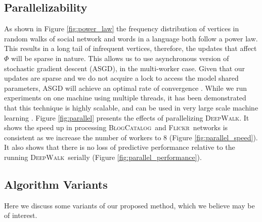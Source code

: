 \documentclass{sig-alternate}
\newcommand{\blogcatalog}{\textsc{BlogCatalog}}
\newcommand{\flickr}{\textsc{Flickr}}
\newcommand{\ouralgorithm}{\textsc{DeepWalk}}
\begin{document}
\subsection{Parallelizability}
As shown in Figure \ref{fig:power_law} the frequency distribution of vertices in random walks of social network and words in a language both follow a power law.
This results in a long tail of infrequent vertices, therefore, the updates that affect $\Phi$ will be sparse in nature.
This allows us to use asynchronous version of stochastic gradient descent (ASGD), in the multi-worker case.
Given that our updates are sparse and we do not acquire a lock to access the model shared parameters, ASGD will  achieve an optimal rate of convergence \cite{hogwild}.
While we run experiments on one machine using multiple threads, it has been demonstrated that this technique is highly scalable, and can be used in very large scale machine learning \cite{largedeep}.
Figure \ref{fig:parallel} presents the effects of parallelizing \ouralgorithm.  It shows the speed up in processing \blogcatalog\ and \flickr\ networks is consistent as we increase the number of workers to 8 (Figure \ref{fig:parallel_speed}).
It also shows that there is no loss of predictive performance relative to the running \ouralgorithm\ serially (Figure \ref{fig:parallel_performance}).





\subsection{Algorithm Variants}
Here we discuss some variants of our proposed method, which we believe may be of interest.
\end{document}
